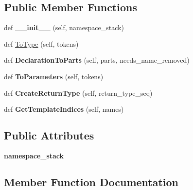 \subsection*{Public Member Functions}
\begin{DoxyCompactItemize}
\item 
\mbox{\label{classcpp_1_1ast_1_1_type_converter_ae6e75773d6722cdbb96d510a49cb633a}} 
def {\bfseries \+\_\+\+\_\+init\+\_\+\+\_\+} (self, namespace\+\_\+stack)
\item 
def \mbox{\hyperlink{classcpp_1_1ast_1_1_type_converter_aa6ea82e40cd30e5dfcd471ff144a19cf}{To\+Type}} (self, tokens)
\item 
\mbox{\label{classcpp_1_1ast_1_1_type_converter_a7c9d20d107c2bc0eb80afdf04957825f}} 
def {\bfseries Declaration\+To\+Parts} (self, parts, needs\+\_\+name\+\_\+removed)
\item 
\mbox{\label{classcpp_1_1ast_1_1_type_converter_aeaf27fb1890f65d7216703df610b46d5}} 
def {\bfseries To\+Parameters} (self, tokens)
\item 
\mbox{\label{classcpp_1_1ast_1_1_type_converter_a7e4d429131d9d5742ec44c78b61beb87}} 
def {\bfseries Create\+Return\+Type} (self, return\+\_\+type\+\_\+seq)
\item 
\mbox{\label{classcpp_1_1ast_1_1_type_converter_a7b5244be5a0caedd769ae866f8a182aa}} 
def {\bfseries Get\+Template\+Indices} (self, names)
\end{DoxyCompactItemize}
\subsection*{Public Attributes}
\begin{DoxyCompactItemize}
\item 
\mbox{\label{classcpp_1_1ast_1_1_type_converter_abb739f15c6cd0800e07c086c2b30833e}} 
{\bfseries namespace\+\_\+stack}
\end{DoxyCompactItemize}


\subsection{Member Function Documentation}
\mbox{\label{classcpp_1_1ast_1_1_type_converter_aa6ea82e40cd30e5dfcd471ff144a19cf}} 
